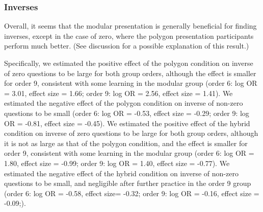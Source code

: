 \documentclass[man,10pt]{apa6}
\begin{document}
\subsubsection{Inverses} Overall, it seems that the modular presentation is generally beneficial for finding inverses, except in the case of zero, where the polygon presentation participants perform much better. (See discussion for a possible explanation of this result.)\par 
Specifically, we estimated the positive effect of the polygon condition on inverse of zero questions to be large for both group orders, although the effect is smaller for order 9, consistent with some learning in the modular group (order 6: log OR = 3.01, effect size = 1.66; order 9: log OR = 2.56, effect size = 1.41). We estimated the negative effect of the polygon condition on inverse of non-zero questions to be small (order 6: log OR = -0.53, effect size = -0.29; order 9: log OR = -0.81, effect size = -0.45). We estimated the positive effect of the hybrid condition on inverse of zero questions to be large for both group orders, although it is not as large as that of the polygon condition, and the effect is smaller for order 9, consistent with some learning in the modular group (order 6: log OR = 1.80, effect size = -0.99; order 9: log OR = 1.40, effect size = -0.77). We estimated the negative effect of the hybrid condition on inverse of non-zero questions to be small, and negligible after further practice in the order 9 group (order 6: log OR = -0.58, effect size= -0.32; order 9: log OR = -0.16, effect size = -0.09;).\par
\end{document}
